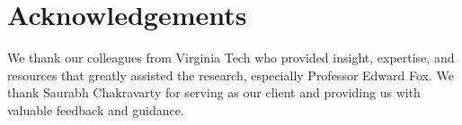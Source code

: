 
\section{Acknowledgements}

We thank our colleagues from Virginia Tech who provided insight, expertise, and resources that greatly assisted the research, especially Professor Edward Fox. We thank Saurabh Chakravarty for serving as our client and providing us with valuable feedback and guidance.


